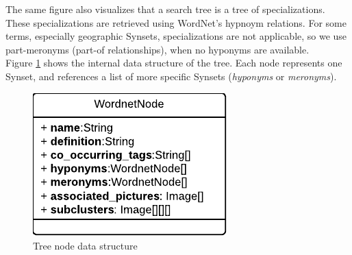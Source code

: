 The same figure also visualizes that a search tree is a tree of specializations. These specializations are retrieved using WordNet's hypnoym relations. For some terms, especially geographic Synsets, specializations are not applicable, so we use part-meronyms (part-of relationships), when no hyponyms are available.\\


Figure \ref{fig_nodestructure} shows the internal data structure of the tree. Each node represents one Synset, and references a list of more specific Synsets (\emph{hyponyms} or \emph{meronyms}).

\begin{figure}[h]
\centering
\includegraphics[]{images/wordnetnode_class_diagram.pdf}
\caption{Tree node data structure}
\label{fig_nodestructure}
\end{figure}


